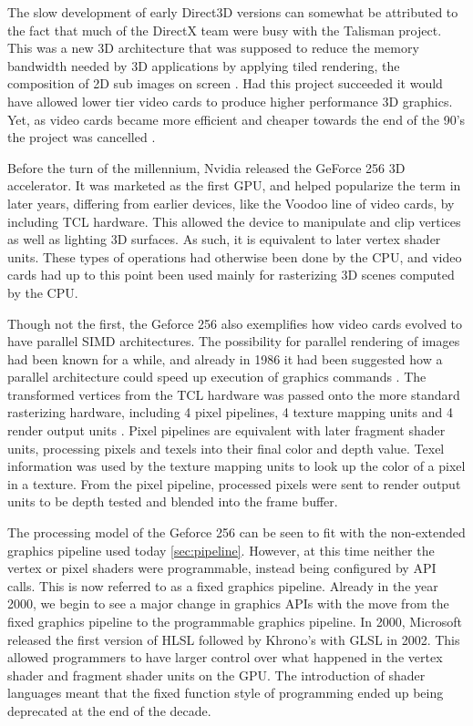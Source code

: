 The slow development of early Direct3D versions can somewhat be attributed to the fact that much of the DirectX team were busy with the Talisman project. 
This was a new 3D architecture that was supposed to reduce the memory bandwidth needed by 3D applications by applying tiled rendering, the composition of 2D sub images on screen \cite{torborg1996talisman}. 
Had this project succeeded it would have allowed lower tier video cards to produce higher performance 3D graphics.
Yet, as video cards became more efficient and cheaper towards the end of the 90’s the project was cancelled \cite{wikipedia????talisman}. 


Before the turn of the millennium, Nvidia released the GeForce 256 3D accelerator.
It was marketed as the first \gls{GPU}, and helped popularize the term in later years, differing from earlier devices, like the Voodoo line of video cards, by including \gls{TCL} hardware.
This allowed the device to manipulate and clip vertices as well as lighting 3D surfaces.
As such, it is equivalent to later vertex shader units. 
These types of operations had otherwise been done by the \gls{CPU}, and video cards had up to this point been used mainly for rasterizing 3D scenes computed by the \gls{CPU}. \cite{wikiGeforce256}


Though not the first, the Geforce 256 also exemplifies how video cards evolved to have parallel SIMD architectures. 
The possibility for parallel rendering of images had been known for a while, and already in 1986 it had been suggested how a parallel architecture could speed up execution of graphics commands . 
The transformed vertices from the \gls{TCL} hardware was passed onto the more standard rasterizing hardware, including 4 pixel pipelines, 4 texture mapping units and 4 render output units \cite{wikiNvidiaList}. 
Pixel pipelines are equivalent with later fragment shader units, processing pixels and texels into their final color and depth value. 
Texel information was used by the texture mapping units to look up the color of a pixel in a texture. 
From the pixel pipeline, processed pixels were sent to render output units to be depth tested and blended into the frame buffer. 


The processing model of the Geforce 256 can be seen to fit with the non-extended graphics pipeline used today \cref{sec:pipeline}. 
However, at this time neither the vertex or pixel shaders were programmable, instead being configured by \gls{API} calls.
This is now referred to as a fixed graphics pipeline.
Already in the year 2000, we begin to see a major change in graphics \glspl{API} with the move from the fixed graphics pipeline to the programmable graphics pipeline.
In 2000, Microsoft released the first version of \gls{HLSL}\cite{wikiHlsl} followed by Khrono’s with \gls{GLSL} in 2002\cite{kronos????history}. 
This allowed programmers to have larger control over what happened in the vertex shader and fragment shader units on the \gls{GPU}. 
The introduction of shader languages meant that the fixed function style of programming ended up being deprecated at the end of the decade. 


